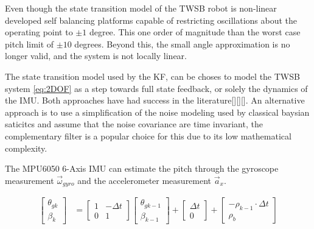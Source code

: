         Even though the state transition model of the TWSB robot is non-linear
        \cite{ooi2003balancing} 
        developed self balancing platforms capable of restricting oscillations about the 
        operating point to $±1$ degree. This one order of magnitude than the worst case pitch limit of $±10$ degrees.
        Beyond this, the small angle approximation is no longer valid, and the system is not locally linear. 

        The state transition model used by the KF, can be choses to model the TWSB system \ref{eq:2DOF} as a step towards 
        full state feedback, or solely the dynamics of the IMU.  Both approaches have had success in the literature[][][]. 
        An alternative approach is to use a simplification of the noise modeling used by classical baysian saticitcs and 
        assume that the noise covariance are time invariant, the complementary filter \cite{ComplimentaryKalman} 
        is a popular choice for this due to its low mathematical complexity. 
     
        The MPU6050 6-Axis IMU can estimate the pitch through the gyroscope measurement $\vec\omega_{gyro}$ and the accelerometer measurement $\vec a_{x}$.

        \begin{equation}
            \begin{aligned}
                \begin{bmatrix}
                    \theta_{g{k}} \\
                    \beta_{k} 
                \end{bmatrix}
                &= 
                \begin{bmatrix}
                    1 & -\Delta t \\
                    0 & 1
                \end{bmatrix}
                \begin{bmatrix}
                    \theta_{g{k-1}} \\
                    \beta_{k-1}
                \end{bmatrix}
                +
                \begin{bmatrix}
                    \Delta t \\
                    0
                \end{bmatrix}
                + \begin{bmatrix}
                    -\rho_{k-1}\cdot\Delta t \\
                    \rho_b
                \end{bmatrix}
            \end{aligned}
            \label{eq:gyroBias1}
        \end{equation}
        
